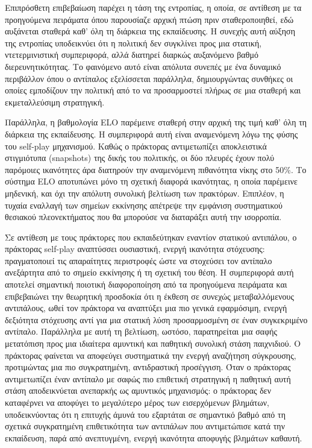 \documentclass[12pt]{article}
\begin{document}
Επιπρόσθετη επιβεβαίωση παρέχει η τάση της εντροπίας, η οποία, σε αντίθεση με τα προηγούμενα πειράματα όπου παρουσίαζε αρχική πτώση πριν σταθεροποιηθεί, εδώ αυξάνεται σταθερά καθ' όλη τη διάρκεια της εκπαίδευσης. Η συνεχής αυτή αύξηση της εντροπίας υποδεικνύει ότι η πολιτική δεν συγκλίνει προς μια στατική, ντετερμινιστική συμπεριφορά, αλλά διατηρεί διαρκώς αυξανόμενο βαθμό διερευνητικότητας. Το φαινόμενο αυτό είναι απόλυτα συνεπές με ένα δυναμικό περιβάλλον όπου ο αντίπαλος εξελίσσεται παράλληλα, δημιουργώντας συνθήκες οι οποίες εμποδίζουν την πολιτική από το να προσαρμοστεί πλήρως σε μια σταθερή και εκμεταλλεύσιμη στρατηγική.

Παράλληλα, η βαθμολογία ELO παρέμεινε σταθερή στην αρχική της τιμή καθ' όλη τη διάρκεια της εκπαίδευσης. Η συμπεριφορά αυτή είναι αναμενόμενη λόγω της φύσης του self-play μηχανισμού. Καθώς ο πράκτορας αντιμετωπίζει αποκλειστικά στιγμιότυπα (snapshots) της δικής του πολιτικής, οι δύο πλευρές έχουν πολύ παρόμοιες ικανότητες άρα διατηρούν την αναμενόμενη πιθανότητα νίκης στο 50\%. Το σύστημα ELO αποτυπώνει μόνο τη σχετική διαφορά ικανότητας, η οποία παρέμεινε μηδενική, και όχι την απόλυτη συνολική βελτίωση των πρακτόρων. Επιπλέον, η τυχαία εναλλαγή των σημείων εκκίνησης απέτρεψε την εμφάνιση συστηματικού θεσιακού πλεονεκτήματος που θα μπορούσε να διαταράξει αυτή την ισορροπία.

Σε αντίθεση με τους πράκτορες που εκπαιδεύτηκαν εναντίον στατικού αντιπάλου, ο πράκτορας self-play αναπτύσσει ουσιαστική, ενεργή ικανότητα στόχευσης: πραγματοποιεί τις απαραίτητες περιστροφές ώστε να στοχεύσει τον αντίπαλο ανεξάρτητα από το σημείο εκκίνησης ή τη σχετική του θέση. Η συμπεριφορά αυτή αποτελεί σημαντική ποιοτική διαφοροποίηση από τα προηγούμενα πειράματα και επιβεβαιώνει την θεωρητική προσδοκία ότι η έκθεση σε συνεχώς μεταβαλλόμενους αντιπάλους, ωθεί τον πράκτορα να αναπτύξει μια πιο γενικά εφαρμόσιμη, ενεργή δεξιότητα στόχευσης αντί για μια στατική λύση προσαρμοσμένη σε έναν συγκεκριμένο αντίπαλο. Παράλληλα με αυτή τη βελτίωση, ωστόσο, παρατηρείται μια σαφής μετατόπιση προς μια ιδιαίτερα αμυντική και παθητική συνολική στάση παιχνιδιού. Ο πράκτορας φαίνεται να αποφεύγει συστηματικά την ενεργή αναζήτηση σύγκρουσης, προτιμώντας μια πιο συγκρατημένη, αντιδραστική προσέγγιση. Όταν ο πράκτορας αντιμετωπίζει έναν αντίπαλο με σαφώς πιο επιθετική στρατηγική η παθητική αυτή στάση αποδεικνύεται ανεπαρκής ως αμυντικός μηχανισμός: ο πράκτορας δεν καταφέρνει να αποφύγει το μεγαλύτερο μέρος των εισερχόμενων βλημάτων, υποδεικνύοντας ότι η επιτυχής άμυνά του εξαρτάται σε σημαντικό βαθμό από τη σχετικά συγκρατημένη επιθετικότητα των αντιπάλων που αντιμετώπισε κατά την εκπαίδευση, παρά από ανεπτυγμένη, ενεργή ικανότητα αποφυγής βλημάτων καθαυτή.
\end{document}
